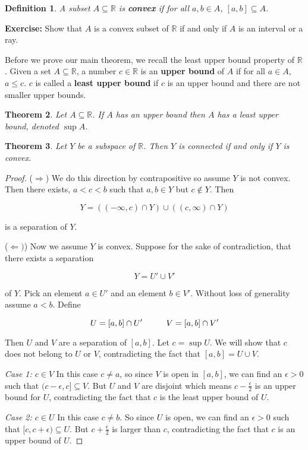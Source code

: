 \documentclass[a4paper]{article}
\newtheorem{theorem}{Theorem}
\newtheorem{definition}[theorem]{Definition}
\numberwithin{theorem}{section}
\begin{document}
\begin{definition}
A subset $A \subseteq \mathbb{R}$ is \textbf{convex} if for all $a,b \in A$, $[a,b] \subseteq A$.
\end{definition}

\textbf{Exercise:} Show that $A$ is a convex subset of $\mathbb{R}$ if and only if $A$ is an interval or a ray.

Before we prove our main theorem, we recall the least upper bound property of $\mathbb{R}$. Given a set $A \subseteq \mathbb{R}$, a number $c \in \mathbb{R}$ is an \textbf{upper bound} of $A$ if for all $a \in A$, $a \leq c$. $c$ is called a \textbf{least upper bound} if $c$ is an upper bound and there are not smaller upper bounds. 

\begin{theorem}
Let $A \subseteq \mathbb{R}$. If $A$ has an upper bound then $A$ has a least upper bound, denoted $\sup A$.

\end{theorem}

\begin{theorem} \label{convex}
Let $Y$ be a subspace of $\mathbb{R}$. Then $Y$ is connected if and only if $Y$ is convex.
\end{theorem}
\begin{proof}
($\Rightarrow$) We do this direction by contrapositive so assume $Y$ is not convex. Then there exists, $a < c < b$ such that $a,b \in Y$ but $c \not \in Y$. Then

$$ Y = ((-\infty,c) \cap Y) \cup ((c, \infty) \cap Y) $$

is a separation of $Y$.

($\Leftarrow)$) Now we assume $Y$ is convex. Suppose for the sake of contradiction, that there exists a separation 

$$ Y = U' \cup V' $$

of $Y$. Pick an element $a \in U'$ and an element $b \in V'$. Without loss of generality assume $a < b$. Define

$$ U = [a,b] \cap U'  \hspace{1 cm} V = [a,b] \cap V' $$

Then $U$ and $V$ are a separation of $[a,b]$. Let $c = \sup U$. We will show that $c$ does not belong to $U$ or $V$, contradicting the fact that $[a,b] = U \cup V$.

\textit{Case 1: $c \in V$} In this case $c \neq a$, so since $V$ is open in $[a,b]$, we can find an $\epsilon > 0$ such that $(c- \epsilon, c] \subseteq V$. But $U$ and $V$ are disjoint which means $c- \frac{\epsilon}{2}$ is an upper bound for $U$, contradicting the fact that $c$ is the least upper bound of $U$.

\textit{Case 2: $c \in U$} In this case $c \neq b$. So since $U$ is open, we can find an $\epsilon > 0$ such that $[c,c+\epsilon) \subseteq U$. But $c + \frac{\epsilon}{2}$ is larger than $c$, contradicting the fact that $c$ is an upper bound of $U$.

\end{proof}
\end{document}
